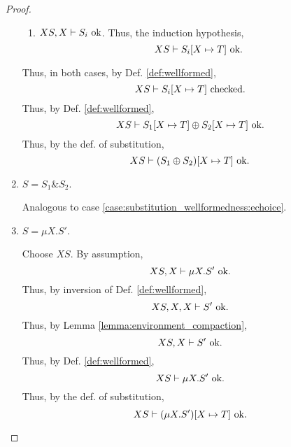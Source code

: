 \documentclass{llncs}
\newcommand*{\echoice}{\oplus}
\newcommand*{\ichoice}{\mathop{\&}}
\newcommand*{\envimpl}       [2]{#1 \vdash #2}
\newcommand*{\envimplchecked}[2]{\envimpl{#1}{\text{$#2$ {\normalfont \rmfamily checked}}}}
\newcommand*{\envimplok}     [2]{\envimpl{#1}{\text{$#2$ {\normalfont \rmfamily ok}}}}
\renewcommand*{\|}{\;|\;}
\begin{document}
\begin{proof}
\begin{enumerate}
\begin{enumerate}
        \item $\envimplok{XS, X}{S_i}$.
          Thus, the induction hypothesis,
          \begin{equation*}
            \envimplok{XS}{S_i[X \mapsto T]}.
          \end{equation*}
      \end{enumerate}

      Thus, in both cases, by Def. \ref{def:wellformed},
      \begin{equation*}
        \envimplchecked{XS}{S_i[X \mapsto T]}.
      \end{equation*}
      Thus, by Def. \ref{def:wellformed},
      \begin{equation*}
        \envimplok{XS}{S_1[X \mapsto T] \echoice S_2[X \mapsto T]}.
      \end{equation*}
      Thus, by the def. of substitution,
      \begin{equation*}
        \envimplok{XS}{(S_1 \echoice S_2)[X \mapsto T]}.
      \end{equation*}

    \item
      \label{case:substitution_wellformedness:ichoice}
      $S = S_1 \ichoice S_2$.

      Analogous to case \ref{case:substitution_wellformedness:echoice}.

    \item
      \label{case:substitution_wellformedness:mu1}
      $S = \mu X.S'$.

      Choose $XS$. By assumption,
      \begin{equation*}
        \envimplok{XS, X}{\mu X.S'}.
      \end{equation*}
      Thus, by inversion of Def. \ref{def:wellformed},
      \begin{equation*}
        \envimplok{XS, X, X}{S'}.
      \end{equation*}
      Thus, by Lemma \ref{lemma:environment_compaction},
      \begin{equation*}
        \envimplok{XS, X}{S'}.
      \end{equation*}
      Thus, by Def. \ref{def:wellformed},
      \begin{equation*}
        \envimplok{XS}{\mu X.S'}.
      \end{equation*}
      Thus, by the def. of substitution,
      \begin{equation*}
        \envimplok{XS}{(\mu X.S')[X \mapsto T]}.
      \end{equation*}


\end{enumerate}
\end{proof}
\end{document}
